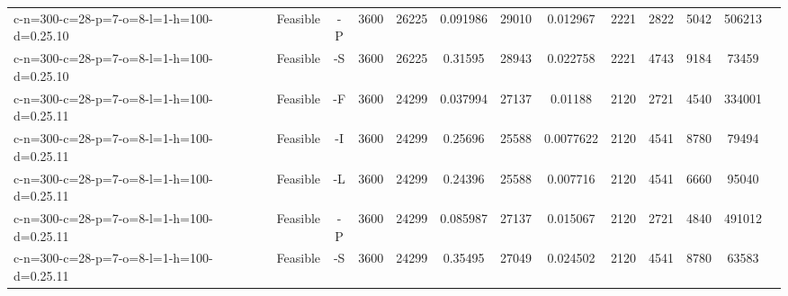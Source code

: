 \documentclass[landscape, a4paper]{article}
\begin{document}
\begin{center}
\begin{tabular}{lcccccccccccc}
c-n=300-c=28-p=7-o=8-l=1-h=100-d=0.25.10 & Feasible & -P & 3600 & 26225 & 0.091986 & 29010 & 0.012967 & 2221 & 2822 & 5042 & 506213 & \\
c-n=300-c=28-p=7-o=8-l=1-h=100-d=0.25.10 & Feasible & -S & 3600 & 26225 & 0.31595 & 28943 & 0.022758 & 2221 & 4743 & 9184 & 73459 & \\
c-n=300-c=28-p=7-o=8-l=1-h=100-d=0.25.11 & Feasible & -F & 3600 & 24299 & 0.037994 & 27137 & 0.01188 & 2120 & 2721 & 4540 & 334001 & \\
c-n=300-c=28-p=7-o=8-l=1-h=100-d=0.25.11 & Feasible & -I & 3600 & 24299 & 0.25696 & 25588 & 0.0077622 & 2120 & 4541 & 8780 & 79494 & \\
c-n=300-c=28-p=7-o=8-l=1-h=100-d=0.25.11 & Feasible & -L & 3600 & 24299 & 0.24396 & 25588 & 0.007716 & 2120 & 4541 & 6660 & 95040 & \\
c-n=300-c=28-p=7-o=8-l=1-h=100-d=0.25.11 & Feasible & -P & 3600 & 24299 & 0.085987 & 27137 & 0.015067 & 2120 & 2721 & 4840 & 491012 & \\
c-n=300-c=28-p=7-o=8-l=1-h=100-d=0.25.11 & Feasible & -S & 3600 & 24299 & 0.35495 & 27049 & 0.024502 & 2120 & 4541 & 8780 & 63583 & \\
\end{tabular}
\end{center}
\end{document}
